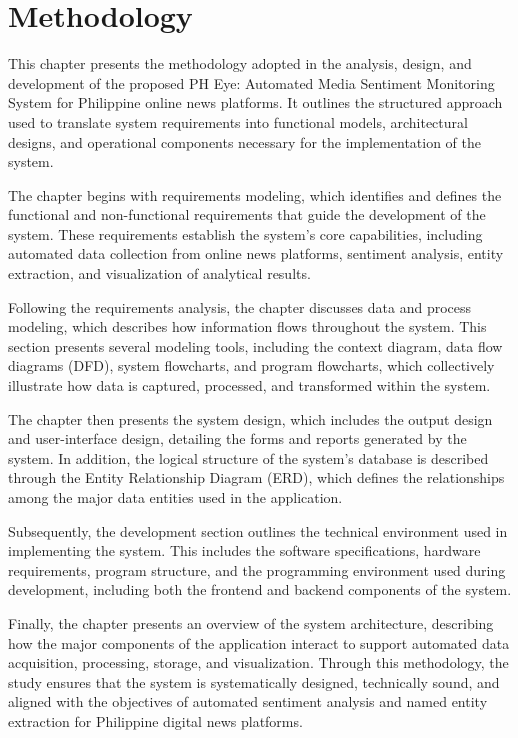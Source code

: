 \section{Methodology}
This chapter presents the methodology adopted in the analysis, design, and development of the proposed PH Eye: Automated Media Sentiment Monitoring System for Philippine online news platforms. It outlines the structured approach used to translate system requirements into functional models, architectural designs, and operational components necessary for the implementation of the system.

The chapter begins with requirements modeling, which identifies and defines the functional and non-functional requirements that guide the development of the system. These requirements establish the system's core capabilities, including automated data collection from online news platforms, sentiment analysis, entity extraction, and visualization of analytical results.

Following the requirements analysis, the chapter discusses data and process modeling, which describes how information flows throughout the system. This section presents several modeling tools, including the context diagram, data flow diagrams (DFD), system flowcharts, and program flowcharts, which collectively illustrate how data is captured, processed, and transformed within the system.

The chapter then presents the system design, which includes the output design and user-interface design, detailing the forms and reports generated by the system. In addition, the logical structure of the system's database is described through the Entity Relationship Diagram (ERD), which defines the relationships among the major data entities used in the application.

Subsequently, the development section outlines the technical environment used in implementing the system. This includes the software specifications, hardware requirements, program structure, and the programming environment used during development, including both the frontend and backend components of the system.

Finally, the chapter presents an overview of the system architecture, describing how the major components of the application interact to support automated data acquisition, processing, storage, and visualization. Through this methodology, the study ensures that the system is systematically designed, technically sound, and aligned with the objectives of automated sentiment analysis \cite{ref08} and named entity extraction \cite{ref26} for Philippine digital news platforms.

